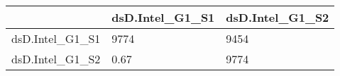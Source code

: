 \begin{table}[ht]
\centering
\begin{tabular}{rll}
  \hline
 & dsD.Intel\_G1\_S1 & dsD.Intel\_G1\_S2 \\ 
  \hline
dsD.Intel\_G1\_S1 & 9774 & 9454 \\ 
  dsD.Intel\_G1\_S2 &  0.67 & 9774 \\ 
   \hline
\end{tabular}
\end{table}

